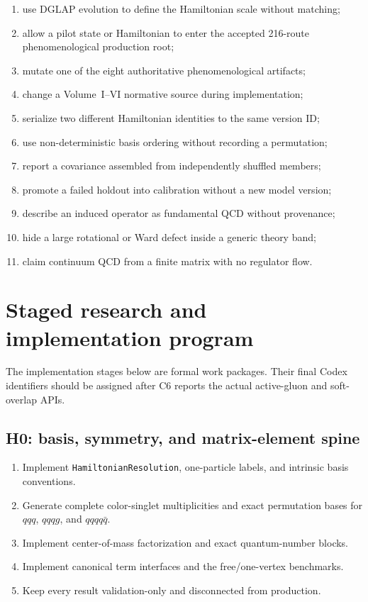 \documentclass[11pt]{article}
\begin{document}
\begin{enumerate}
 \item use DGLAP evolution to define the Hamiltonian scale without matching;
 \item allow a pilot state or Hamiltonian to enter the accepted 216-route
 phenomenological production root;
 \item mutate one of the eight authoritative phenomenological artifacts;
 \item change a Volume~I--VI normative source during implementation;
 \item serialize two different Hamiltonian identities to the same version ID;
 \item use non-deterministic basis ordering without recording a permutation;
 \item report a covariance assembled from independently shuffled members;
 \item promote a failed holdout into calibration without a new model version;
 \item describe an induced operator as fundamental QCD without provenance;
 \item hide a large rotational or Ward defect inside a generic theory band;
 \item claim continuum QCD from a finite matrix with no regulator flow.
\end{enumerate}

\section{Staged research and implementation program}
\label{sec:stages}

The implementation stages below are formal work packages.  Their final Codex
identifiers should be assigned after C6 reports the actual active-gluon and
soft-overlap APIs.

\subsection{H0: basis, symmetry, and matrix-element spine}

\begin{enumerate}
 \item Implement \texttt{HamiltonianResolution}, one-particle labels, and
 intrinsic basis conventions.
 \item Generate complete color-singlet multiplicities and exact permutation
 bases for \(qqq\), \(qqqg\), and \(qqqq\bar q\).
 \item Implement center-of-mass factorization and exact quantum-number blocks.
 \item Implement canonical term interfaces and the free/one-vertex benchmarks.
 \item Keep every result validation-only and disconnected from production.
\end{enumerate}
\end{document}
